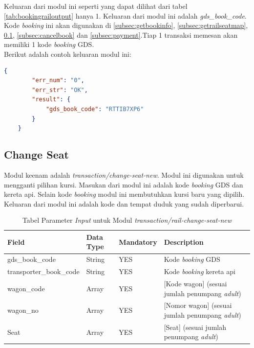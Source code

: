 Keluaran dari modul ini seperti yang dapat dilihat dari tabel \ref{tab:bookingrailoutput} hanya 1. Keluaran dari modul ini adalah \textit{gds\_book\_code}. Kode \textit{booking} ini akan digunakan di \ref{subsec:getbookinfo}, \ref{subsec:getrailseatmap}, \ref{subsec:railchangeseat}, \ref{subsec:cancelbook} dan \ref{subsec:payment}.Tiap 1 transaksi memesan akan memiliki 1 kode \textit{booking} GDS.\\

Berikut adalah contoh keluaran modul ini:

\begin{lstlisting}[language=json]
    {
        "err_num": "0",
        "err_str": "OK",
        "result": {
            "gds_book_code": "RTTIB7XP6"
        }
    }
\end{lstlisting}

\subsection{Change Seat}
\label{subsec:railchangeseat}

Modul keenam adalah \textit{transaction/change-seat-new}. Modul ini digunakan untuk mengganti pilihan kursi. Masukan dari modul ini adalah kode \textit{booking} GDS dan kereta api. Selain kode \textit{booking} modul ini membutuhkan kursi baru yang dipilih. Keluaran dari modul ini adalah kode dan tempat duduk yang sudah diperbarui.

\begin{table}[H]
	\centering 
	\caption{Tabel Parameter \textit{Input} untuk Modul \textit{transaction/rail-change-seat-new}}
	\label{tab:railchangeseatinput}
	\begin{tabular}{|l|l|l|l|}
		\hline
		Field & Data Type & Mandatory & Description\\
		\hline
		
		\hline
        gds\_book\_code & String & YES & Kode \textit{booking} GDS\\
        \hline
        transporter\_book\_code & String & YES & Kode \textit{booking} kereta api\\
        \hline
        wagon\_code & Array & YES & [Kode wagon] (sesuai jumlah penumpang \textit{adult})\\
        \hline
        wagon\_no & Array & YES & [Nomor wagon] (sesuai jumlah penumpang \textit{adult})\\
        \hline
        Seat & Array & YES & [Seat] (sesuai jumlah penumpang \textit{adult})\\
        \hline
        
	\end{tabular} 
\end{table}

